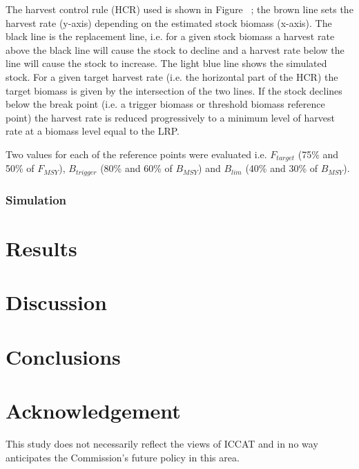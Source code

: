 \documentclass[%
nonumbib,      %
%
]{nrc1}                          %
\begin{document}
The harvest control rule (HCR) used is shown in Figure~%
; the brown line sets the harvest rate (y-axis) depending on the estimated stock biomass (x-axis). The black line is the replacement line, i.e. for a given stock biomass a harvest rate above the black line will cause the stock to decline and a harvest rate below the line will cause the stock to increase. The light blue line shows the simulated stock. For a given target harvest rate (i.e. the horizontal part of the HCR) the target biomass is given by the intersection of the two lines. If the stock declines below the break point (i.e. a trigger biomass or threshold biomass reference point) the harvest rate is reduced progressively to a minimum level of harvest rate at a biomass level equal to the LRP.

Two values for each of the reference points were evaluated i.e.  $F_{target}$ (75\% and 50\% of $F_{MSY}$), $B_{trigger}$ (80\% and 60\% of $B_{MSY}$) and $B_{lim}$ (40\% and 30\% of $B_{MSY}$).  


\subsubsection*{Simulation}


\section*{Results}


\section*{Discussion}


\newpage
\section*{Conclusions}


\section{Acknowledgement}

This study does not necessarily reflect the views of ICCAT and in no way anticipates the Commission's future policy in this area. 

\newpage\clearpage


%
\end{document}
